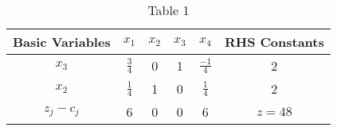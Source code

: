 \begin{table}[h]
	\centering
	\caption{Table 1}
	\begin{tabular}{|c|c|c|c|c|c|}
	\hline
	Basic Variables & $x_1$ & $x_2$ & $x_3$ & $x_4$ & RHS Constants \\
	\hline
	$x_3$ & $\frac{3}{4}$ & 0 & 1 & $\frac{-1}{4}$ & 2 \\
	\hline
	$x_2$ & $\frac{1}{4}$ & 1 & 0 & $\frac{1}{4}$ & 2 \\
	\hline
	$z_j - c_j$ & 6 & 0 & 0 & 6 & $z=48$ \\
	\hline
	\end{tabular}
	\label{tab: Table_1}
\end{table}
